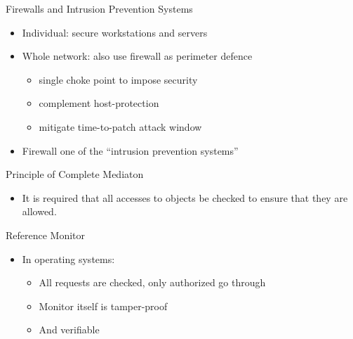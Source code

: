 \documentclass{beamer}
\begin{document}

\begin{frame}{Firewalls and Intrusion Prevention Systems}
  \begin{itemize}
  \item Individual: secure workstations and servers 
  \item Whole network: also use firewall as perimeter 
    defence 
    \begin{itemize}
    \item single choke point to impose security
    \item complement host-protection
    \item mitigate time-to-patch attack window
    \end{itemize}
  \item Firewall one of the ``intrusion prevention systems''
  \end{itemize}
\end{frame}

\begin{frame}{Principle of Complete Mediaton}
  \begin{itemize}
    \item It is required that all accesses to objects be checked 
to ensure that they are allowed.
  \end{itemize}
\end{frame}

\begin{frame}{Reference Monitor}
  \begin{itemize}
  \item In operating systems: 
    \begin{itemize}
    \item All requests are checked, only authorized go 
      through 
    \item Monitor itself is tamper-proof 
    \item And verifiable 
    \end{itemize}
  \end{itemize}
\end{frame}
\end{document}
